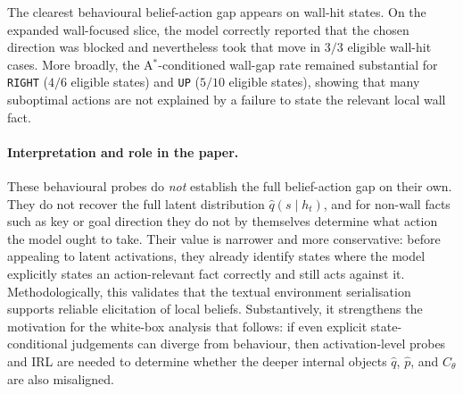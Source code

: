 \begin{result}
The clearest behavioural belief-action gap appears on wall-hit states. On the expanded
wall-focused slice, the model correctly reported that the chosen direction was blocked and
nevertheless took that move in $3/3$ eligible wall-hit cases. More broadly, the
A$^*$-conditioned wall-gap rate remained substantial for \texttt{RIGHT} ($4/6$ eligible
states) and \texttt{UP} ($5/10$ eligible states), showing that many suboptimal actions are
not explained by a failure to state the relevant local wall fact.
\end{result}

\paragraph{Interpretation and role in the paper.}
These behavioural probes do \emph{not} establish the full belief-action gap on their own.
They do not recover the full latent distribution $\hat{q}(s\mid h_t)$, and for non-wall
facts such as key or goal direction they do not by themselves determine what action the model
ought to take. Their value is narrower and more conservative: before appealing to latent
activations, they already identify states where the model explicitly states an action-relevant
fact correctly and still acts against it. Methodologically, this validates that the textual
environment serialisation supports reliable elicitation of local beliefs. Substantively, it
strengthens the motivation for the white-box analysis that follows: if even explicit
state-conditional judgements can diverge from behaviour, then activation-level probes and IRL
are needed to determine whether the deeper internal objects $\hat{q}$, $\hat{p}$, and
$C_\theta$ are also misaligned.
